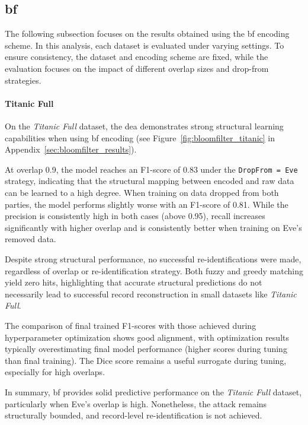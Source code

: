 \subsection{\ac{bf}}

The following subsection focuses on the results obtained using the \ac{bf} encoding scheme.
In this analysis, each dataset is evaluated under varying settings.
To ensure consistency, the dataset and encoding scheme are fixed, while the evaluation focuses on the impact of different overlap sizes and drop-from strategies.

\paragraph{Titanic Full}

On the \textit{Titanic Full} dataset, the \ac{dea} demonstrates strong structural learning capabilities when using \ac{bf} encoding (see Figure~\ref{fig:bloomfilter_titanic} in Appendix~\ref{sec:bloomfilter_results}).

At overlap 0.9, the model reaches an F1-score of 0.83 under the \texttt{DropFrom = Eve} strategy, indicating that the structural mapping between encoded and raw data can be learned to a high degree.
When training on data dropped from both parties, the model performs slightly worse with an F1-score of 0.81.
While the precision is consistently high in both cases (above 0.95), recall increases significantly with higher overlap and is consistently better when training on Eve's removed data.

Despite strong structural performance, no successful re-identifications were made, regardless of overlap or re-identification strategy.
Both fuzzy and greedy matching yield zero hits, highlighting that accurate structural predictions do not necessarily lead to successful record reconstruction in small datasets like \textit{Titanic Full}.

The comparison of final trained F1-scores with those achieved during hyperparameter optimization shows good alignment, with optimization results typically overestimating final model performance (higher scores during tuning than final training).
The Dice score remains a useful surrogate during tuning, especially for high overlaps.

In summary, \ac{bf} provides solid predictive performance on the \textit{Titanic Full} dataset, particularly when Eve's overlap is high.
Nonetheless, the attack remains structurally bounded, and record-level re-identification is not achieved.

